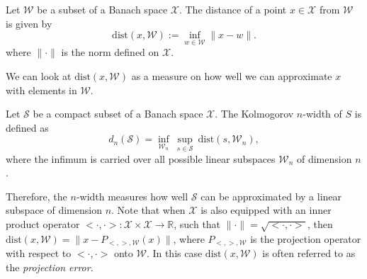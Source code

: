 \begin{definition} \label{def:3.1}
Let $\mathcal W$ be a subset of a Banach space $\mathcal X$. The distance of a point $x\in \mathcal X$ from $\mathcal W$ is given by
\begin{equation}  \label{eq:3.3}
	\text{dist}(x,\mathcal W) := \inf_{w\in \mathcal W} \| x-w \|.
\end{equation}
where $\|\cdot\|$ is the norm defined on $\mathcal X$.
\end{definition}
We can look at $\text{dist}(x,\mathcal W)$ as a measure on how well we can approximate $x$ with elements in $\mathcal W$.
\begin{definition} \label{def:3.2}
Let $\mathcal S$ be a compact subset of a Banach space $\mathcal X$. The Kolmogorov $n$-width of $S$ is defined as
\begin{equation} \label{eq:3.4}
	d_n(\mathcal S) = \inf_{\mathcal W_n} \ \sup_{s\in \mathcal S} \ \text{dist}(s, \mathcal W_n),
\end{equation}
where the infimum is carried over all possible linear subspaces $\mathcal W_n$ of dimension $n$.
\end{definition}
Therefore, the $n$-width measures how well $\mathcal S$ can be approximated by a linear subspace of dimension $n$. Note that when $\mathcal X$ is also equipped with an inner product operator $<\cdot , \cdot> :\mathcal X \times \mathcal X \to \mathbb R $, such that $\| \cdot \| = \sqrt{<\cdot , \cdot>}$, then $\text{dist}(x,\mathcal W) = \| x - P_{<,>,\mathcal W}(x) \|$, where $P_{<,>,\mathcal W}$ is the projection operator with respect to $<\cdot,\cdot>$ onto $\mathcal W$. In this case $\text{dist}(x,\mathcal W)$ is often referred to as the \emph{projection error}.

